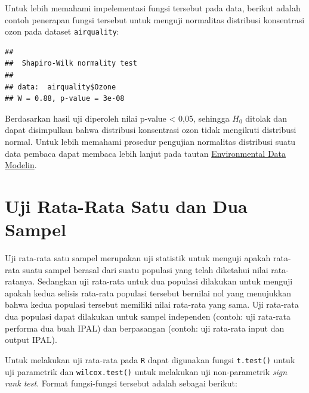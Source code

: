 \documentclass[]{book}
\newenvironment{Shaded}{\begin{snugshade}}{\end{snugshade}}
\newcommand{\KeywordTok}[1]{\textcolor[rgb]{0.13,0.29,0.53}{\textbf{#1}}}
\newcommand{\NormalTok}[1]{#1}
\newcommand{\OperatorTok}[1]{\textcolor[rgb]{0.81,0.36,0.00}{\textbf{#1}}}
\theoremstyle{definition}
\theoremstyle{definition}
\theoremstyle{definition}
\theoremstyle{remark}
\begin{document}
Untuk lebih memahami impelementasi fungsi tersebut pada data, berikut adalah contoh penerapan fungsi tersebut untuk menguji normalitas distribusi konsentrasi ozon pada dataset \texttt{airquality}:

\begin{Shaded}
\end{Shaded}

\begin{verbatim}
## 
##  Shapiro-Wilk normality test
## 
## data:  airquality$Ozone
## W = 0.88, p-value = 3e-08
\end{verbatim}

Berdasarkan hasil uji diperoleh nilai p-value \textless{} 0,05, sehingga \(H_0\) ditolak dan dapat disimpulkan bahwa distribusi konsentrasi ozon tidak mengikuti distribusi normal. Untuk lebih memahami prosedur pengujian normalitas distribusi suatu data pembaca dapat membaca lebih lanjut pada tautan \href{https://environmental-data-modeling.netlify.com/tutorial/11_uji_hipotesis/\#11-4-uji-asumsi-normalitas-distribusi-data}{Environmental Data Modelin}.

\hypertarget{uji-rata-rata-satu-dan-dua-sampel}{%
\section{Uji Rata-Rata Satu dan Dua Sampel}\label{uji-rata-rata-satu-dan-dua-sampel}}

Uji rata-rata satu sampel merupakan uji statistik untuk menguji apakah rata-rata suatu sampel berasal dari suatu populasi yang telah diketahui nilai rata-ratanya. Sedangkan uji rata-rata untuk dua populasi dilakukan untuk menguji apakah kedua selisis rata-rata populasi tersebut bernilai nol yang menujukkan bahwa kedua populasi tersebut memiliki nilai rata-rata yang sama. Uji rata-rata dua populasi dapat dilakukan untuk sampel independen (contoh: uji rata-rata performa dua buah IPAL) dan berpasangan (contoh: uji rata-rata input dan output IPAL).

Untuk melakukan uji rata-rata pada \texttt{R} dapat digunakan fungsi \texttt{t.test()} untuk uji parametrik dan \texttt{wilcox.test()} untuk melakukan uji non-parametrik \emph{sign rank test}. Format fungsi-fungsi tersebut adalah sebagai berikut:
\end{document}
